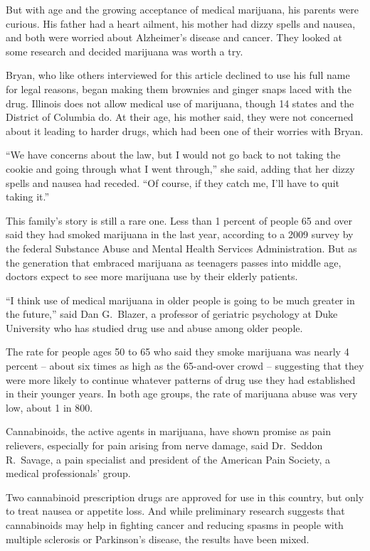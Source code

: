 ﻿\documentclass[12pt]{article}
\begin{document}
But with age and the growing acceptance of medical marijuana, his parents were curious. His father
had a heart ailment, his mother had dizzy spells and nausea, and both were worried about Alzheimer's
disease and cancer. They looked at some research and decided marijuana was worth a try.

Bryan, who like others interviewed for this article declined to use his full name for legal reasons,
began making them brownies and ginger snaps laced with the drug. Illinois does not allow medical use
of marijuana, though 14 states and the District of Columbia do. At their age, his mother said, they
were not concerned about it leading to harder drugs, which had been one of their worries with Bryan.

``We have concerns about the law, but I would not go back to not taking the cookie and going through
what I went through,'' she said, adding that her dizzy spells and nausea had receded. ``Of course,
if they catch me, I'll have to quit taking it.''

This family's story is still a rare one. Less than 1 percent of people 65 and over said they had
smoked marijuana in the last year, according to a 2009 survey by the federal Substance Abuse and
Mental Health Services Administration. But as the generation that embraced marijuana as teenagers
passes into middle age, doctors expect to see more marijuana use by their elderly patients.

``I think use of medical marijuana in older people is going to be much greater in the future,'' said
Dan G.~Blazer, a professor of geriatric psychology at Duke University who has studied drug use and
abuse among older people.

The rate for people ages 50 to 65 who said they smoke marijuana was nearly 4 percent -- about six
times as high as the 65-and-over crowd -- suggesting that they were more likely to continue whatever
patterns of drug use they had established in their younger years. In both age groups, the rate of
marijuana abuse was very low, about 1 in 800.

Cannabinoids, the active agents in marijuana, have shown promise as pain relievers, especially for
pain arising from nerve damage, said Dr.~Seddon R.~Savage, a pain specialist and president of the
American Pain Society, a medical professionals' group.

Two cannabinoid prescription drugs are approved for use in this country, but only to treat nausea or
appetite loss. And while preliminary research suggests that cannabinoids may help in fighting cancer
and reducing spasms in people with multiple sclerosis or Parkinson's disease, the results have been
mixed.
\end{document}
